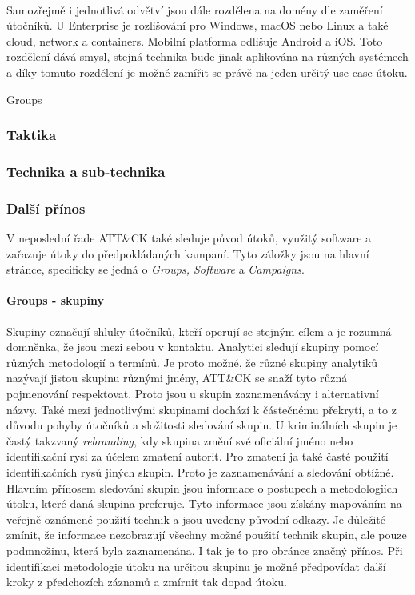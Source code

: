 \paragraph{}
Samozřejmě i jednotlivá odvětví jsou dále rozdělena na domény dle zaměření útočníků.
U Enterprise je rozlišování pro Windows, macOS nebo Linux a také cloud, network a containers.
Mobilní platforma odlišuje Android a iOS\@.
Toto rozdělení dává smysl, stejná technika bude jinak aplikována na různých systémech a díky tomuto rozdělení je možné zamířit se právě na jeden určitý use-case útoku.


Groups
\subsubsection{Taktika}

\subsubsection{Technika a sub-technika}

\subsubsection{Další přínos}
V neposlední řade ATT\&CK také sleduje původ útoků, využitý software a zařazuje útoky do předpokládaných kampaní.
Tyto záložky jsou na hlavní stránce, specificky se jedná o \textit{Groups, Software} a \textit{Campaigns}.

\paragraph{Groups - skupiny}
Skupiny označují shluky útočníků, kteří operují se stejným cílem a je rozumná domněnka, že jsou mezi sebou v kontaktu.
Analytici sledují skupiny pomocí různých  metodologií a termínů.
Je proto možné, že různé skupiny analytiků nazývají jistou skupinu různými jmény, ATT\&CK se snaží tyto různá pojmenování respektovat.
Proto jsou u skupin zaznamenávány i alternativní názvy.
Také mezi jednotlivými skupinami dochází k částečnému překrytí, a to z důvodu pohyby útočníků a složitosti sledování skupin.
U kriminálních skupin je častý takzvaný \textit{rebranding}, kdy skupina změní své oficiální jméno nebo identifikační rysi za účelem zmatení autorit.
Pro zmatení ja také časté použití identifikačních rysů jiných skupin.
Proto je zaznamenávání a sledování obtížné.
Hlavním přínosem sledování skupin jsou informace o postupech a metodologiích útoku, které daná skupina preferuje.
Tyto informace jsou získány mapováním na veřejně oznámené použití technik a jsou uvedeny původní odkazy.
Je důležité zmínit, že informace nezobrazují všechny možné použití technik skupin, ale pouze podmnožinu, která byla zaznamenána.
I tak je to pro obránce značný přínos.
Při identifikaci metodologie útoku na určitou skupinu je možné předpovídat další kroky z předchozích záznamů a zmírnit tak dopad útoku.\cite{Mitre_groups}


